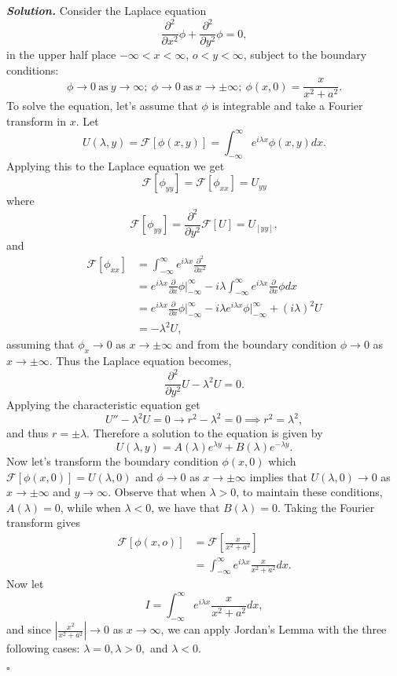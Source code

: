 \documentclass[12pt]{report}
\newenvironment{solution}[1][\it{Solution}]{\textbf{#1. } }{$\square$}
\def\F{{\mathcal{F}}}
\newcommand{\pp}[2]{\frac{\partial #1}{\partial #2}} %
\newcommand{\ppn}[3]{\frac{\partial^{#1} #2}{\partial #3^{#1}}} %
\begin{document}
\begin{solution}
    \noindent
    Consider the Laplace equation
    \[ \ppn{2}{}{x} \phi + \ppn{2}{}{y}\phi = 0,\]
    in the upper half place $-\infty < x < \infty$, $o < y < \infty$, subject to the boundary conditions:
    \[ \phi \to 0 ~\text{as}~ y\to \infty; ~ \phi \to 0 ~\text{as}~ x\to \pm \infty; ~\phi(x,0) = \frac{x}{x^2 + a^2}.\]
    To solve the equation, let's assume that $\phi$ is integrable and take a Fourier transform in $x$. Let 
    \[ 
        U(\lambda,y) = \F[\phi(x,y)] = \int_{-\infty}^{\infty}e^{i\lambda x}\phi(x,y)dx.
    \]
    Applying this to the Laplace equation we get
    \[
        \F[\phi_{yy}] = \F[\phi_{xx}] = U_{yy}
    \]
    where
    \[\F[\phi_{yy}] = \ppn{2}{}{y}\F[U] = U_[yy],\]
    and
    \begin{align*}
        \F[\phi_{xx}] &= \int_{-\infty}^{\infty}e^{i \lambda x}\ppn{2}{}{x}\\
        &= e^{i \lambda x}\pp{}{x}\phi\bigg|_{-\infty}^{\infty} - i\lambda\int_{-\infty}^{\infty}e^{i \lambda x}\pp{}{x}\phi dx\\
        &=e^{i \lambda x}\pp{}{x}\phi\bigg|_{-\infty}^{\infty} - i \lambda e^{i\lambda x}\phi \bigg|_{-\infty}^{\infty} + (i\lambda)^2U\\
        &= - \lambda^2U,
    \end{align*}
    assuming that $\phi_x \to 0$ as $x \to \pm\infty$ and from the boundary condition $\phi \to 0$ as $x \to \pm\infty$. Thus the Laplace equation becomes,
    \[ \ppn{2}{}{y}U  - \lambda^2 U = 0.\]
    Applying the characteristic equation get
    \[ U'' - \lambda^2U = 0 \to r^2 - \lambda^2 = 0 \implies r^2 = \lambda^2,\]
    and thus $r = \pm \lambda$. Therefore a solution to the equation is given by
    \[U(\lambda, y) = A(\lambda)e^{\lambda y} + B(\lambda)e^{-\lambda y}.\]
    Now let's transform the boundary condition $\phi(x,0)$ which $\F[\phi(x,0)] = U(\lambda,0)$ and $\phi \to 0$ as $x \to \pm \infty$ implies that $U(\lambda,0) \to 0$ as $x \to \pm \infty$ and $y \to \infty$. Observe that when $\lambda > 0$, to maintain these conditions, $A(\lambda) = 0$, while when $\lambda < 0$, we have that $B(\lambda)=0$. Taking the Fourier transform gives
    \begin{align*}
        \F[\phi(x,o)] &= \F\left[ \frac{x}{x^2 + a^2}\right]\\
        &= \int_{-\infty}^{\infty}e^{i\lambda x}\frac{x}{x^2 + a^2}dx.
    \end{align*} 
    Now let
    \[ I = \int_{-\infty}^{\infty}e^{i\lambda x}\frac{x}{x^2 + a^2}dx,\]
    and since $\left| \frac{x^2}{x^2 + a^2} \right| \to 0$ as $x \to \infty$, we can apply Jordan's Lemma with the three following cases: $\lambda = 0, \lambda > 0,$ and $\lambda <0$.


\end{solution}
\end{document}
